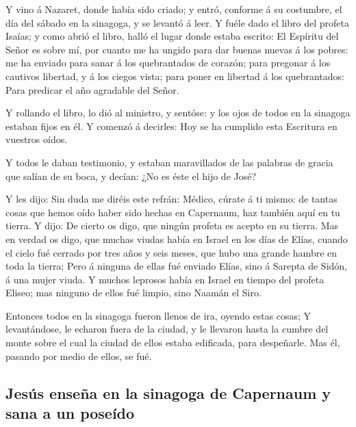  Y vino á Nazaret, donde había sido criado; y entró,
conforme á su costumbre, el día del sábado en la sinagoga, y se levantó
á leer.  Y fuéle dado el libro del profeta Isaías; y como
abrió el libro, halló el lugar donde estaba escrito:  El
Espíritu del Señor es sobre mí, por cuanto me ha ungido para dar buenas
nuevas á los pobres: me ha enviado para sanar á los quebrantados de
corazón; para pregonar á los cautivos libertad, y á los ciegos vista;
para poner en libertad á los quebrantados:  Para predicar
el año agradable del Señor.

 Y rollando el libro, lo dió al ministro, y sentóse: y
los ojos de todos en la sinagoga estaban fijos en él.  Y
comenzó á decirles: Hoy se ha cumplido esta Escritura en vuestros oídos.

 Y todos le daban testimonio, y estaban maravillados de
las palabras de gracia que salían de su boca, y decían: ¿No es éste el
hijo de José?

 Y les dijo: Sin duda me diréis este refrán: Médico,
cúrate á ti mismo: de tantas cosas que hemos oído haber sido hechas en
Capernaum, haz también aquí en tu tierra.  Y dijo: De
cierto os digo, que ningún profeta es acepto en su tierra.
 Mas en verdad os digo, que muchas viudas había en Israel
en los días de Elías, cuando el cielo fué cerrado por tres años y seis
meses, que hubo una grande hambre en toda la tierra; 
Pero á ninguna de ellas fué enviado Elías, sino á Sarepta de Sidón, á
una mujer viuda.  Y muchos leprosos había en Israel en
tiempo del profeta Eliseo; mas ninguno de ellos fué limpio, sino Naamán
el Siro.

 Entonces todos en la sinagoga fueron llenos de ira,
oyendo estas cosas;  Y levantándose, le echaron fuera de
la ciudad, y le llevaron hasta la cumbre del monte sobre el cual la
ciudad de ellos estaba edificada, para despeñarle.  Mas
él, pasando por medio de ellos, se fué.

\hypertarget{jesuxfas-enseuxf1a-en-la-sinagoga-de-capernaum-y-sana-a-un-poseuxeddo}{%
\subsection{Jesús enseña en la sinagoga de Capernaum y sana a un
poseído}\label{jesuxfas-enseuxf1a-en-la-sinagoga-de-capernaum-y-sana-a-un-poseuxeddo}}

